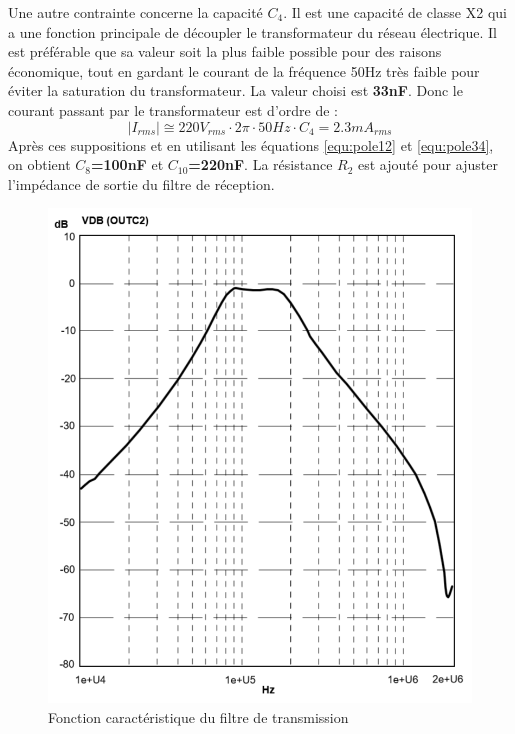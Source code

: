 \documentclass[11pt, a4paper, twoside]{book}
\begin{document}
{Une autre contrainte concerne la capacité $C_4$. Il est une capacité de classe X2 qui a une fonction principale de découpler le transformateur du réseau électrique.  Il est préférable que sa valeur soit la plus faible possible pour des raisons économique, tout en gardant le courant de la fréquence 50Hz très faible pour éviter la saturation du transformateur. La valeur choisi est \textbf{33nF}. Donc le courant passant par le transformateur est d'ordre de :
\begin{equation}
|I_{rms}|\cong 220V_{rms}\cdot 2\pi \cdot 50Hz\cdot C_4=2.3mA_{rms}
\end{equation}
Après ces suppositions et en utilisant les équations \ref{equ:pole12} et \ref{equ:pole34}, on obtient \textbf{$C_8$=100nF} et \textbf{$C_{10}$=220nF}.
La résistance $R_2$ est ajouté pour ajuster l'impédance de sortie du filtre de réception.
\begin{figure}[H]
\label{fig:filterCharacteristic}
\centering
\includegraphics[width=\textwidth]{filterCharacteristic}
\caption{Fonction caractéristique du filtre de transmission}
\end{figure}

}
\end{document}
